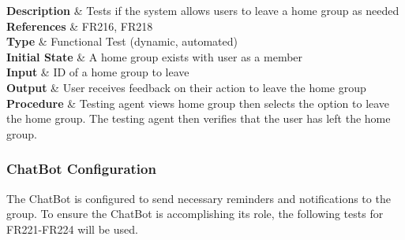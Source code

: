\documentclass[12pt, titlepage]{article}
\begin{document}
\begin{center}
{    \textbf{Description} & Tests if the system allows users to leave a home group as needed \\ 

    \textbf{References} & FR216, FR218 \\ 

    \textbf{Type} & Functional Test (dynamic, automated) \\ 

    \textbf{Initial State} & A home group exists with user as a member \\ 

    \textbf{Input} & ID of a home group to leave\\ 

    \textbf{Output} & User receives feedback on their action to leave the home group \\ 

    \textbf{Procedure} & Testing agent views home group then selects the option to leave the home group. The testing agent then verifies that the user has left the home group. \\ 
  }

\end{center}

\subsubsection{ChatBot Configuration}
The ChatBot is configured to send necessary reminders and notifications to the group. To ensure the ChatBot is accomplishing its role, the following tests for FR221-FR224 will be used.
\end{document}
